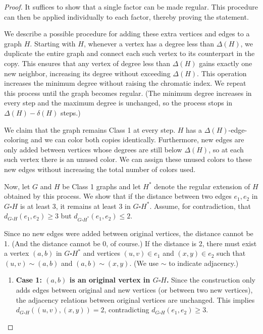 \documentclass[a4paper,12pt]{article}
\begin{document}
\begin{proof}
    It suffices to show that a single factor can be made regular. This procedure can then be applied individually to each factor, thereby proving the statement.

    We describe a possible procedure for adding these extra vertices and edges to a graph $H$. Starting with $H$, whenever a vertex has a degree less than $\Delta(H)$, we duplicate the entire graph and connect each such vertex to its counterpart in the copy. This ensures that any vertex of degree less than $\Delta(H)$ gains exactly one new neighbor, increasing its degree without exceeding $\Delta(H)$. This operation increases the minimum degree without raising the chromatic index. We repeat this process until the graph becomes regular. (The minimum degree increases in every step and the maximum degree is unchanged, so the process stops in $\Delta(H)-\delta(H)$ steps.)

    We claim that the graph remains Class 1 at every step. $H$ has a $\Delta(H)$-edge-coloring and we can color both copies identically. Furthermore, new edges are only added between vertices whose degrees are still below $\Delta(H)$, so at each such vertex there is an unused color. We can assign these unused colors to these new edges without increasing the total number of colors used.

    Now, let $G$ and $H$ be Class 1 graphs and let $H^*$ denote the regular extension of $H$ obtained by this process. We show that if the distance between two edges $e_1, e_2$ in $G \square H$ is at least 3, it remains at least 3 in $G \square H^*$. Assume, for contradiction, that $d_{G \square H}(e_1, e_2) \geq 3$ but $d_{G \square H^*}(e_1, e_2) \leq 2$.

    Since no new edges were added between original vertices, the distance cannot be 1. (And the distance cannot be 0, of course.) If the distance is 2, there must exist a vertex $(a, b)$ in $G \square H^*$ and vertices $(u, v) \in e_1$ and $(x, y) \in e_2$ such that $(u, v) \sim (a, b)$ and $(a, b) \sim (x, y)$. (We  use $\sim$ to indicate adjacency.)
    
    \begin{enumerate}
        \item \textbf{Case 1: $(a, b)$ is an original vertex in $G \square H$.} Since the construction only adds edges between original and new vertices (or between two new vertices), the adjacency relations between original vertices are unchanged. This implies $d_{G \square H}((u, v), (x, y)) = 2$, contradicting $d_{G \square H}(e_1, e_2) \geq 3$.
        

\end{enumerate}
\end{proof}
\end{document}
